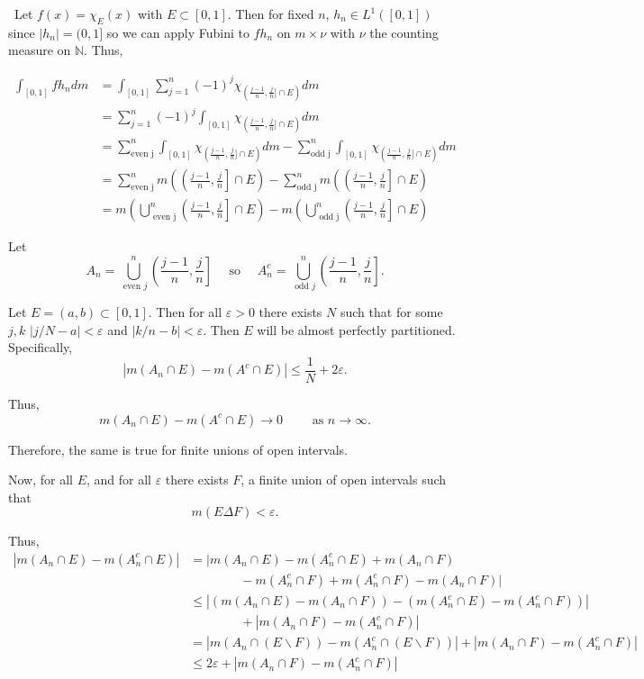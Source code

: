 \documentclass[12pt]{Qual}
\begin{document}
\begin{solution}$\,$
Let $f(x)=\chi_E(x)$ with $E\subset[0,1]$. Then for fixed $n$, $h_n\in L^1([0,1])$ since $|h_n|=(0,1]$ so we can apply Fubini to $fh_n$ on $m\times \nu$ with $\nu$ the counting measure on $\mathbb{N}$. Thus,

\begin{align*}
    \int_{[0,1]}fh_ndm&=\int_{[0,1]}\sum_{j=1}^n(-1)^j\chi_{(\frac{j-1}{n},\frac{j}{n}]\cap E)}dm\\
    &=\sum_{j=1}^n(-1)^j\int_{[0,1]}\chi_{(\frac{j-1}{n},\frac{j}{n}]\cap E)}dm\\
    &=\sum_{\text{even j}}^n\int_{[0,1]}\chi_{(\frac{j-1}{n},\frac{j}{n}]\cap E)}dm-\sum_{\text{odd j}}^n\int_{[0,1]}\chi_{(\frac{j-1}{n},\frac{j}{n}]\cap E)}dm\\
    &=\sum_{\text{even j}}^nm\left(\left(\frac{j-1}{n},\frac{j}{n}\right]\cap E\right)-\sum_{\text{odd j}}^nm\left(\left(\frac{j-1}{n},\frac{j}{n}\right]\cap E\right)\\
    &=m\left(\bigcup_{\text{ even j}}^n\left(\frac{j-1}{n},\frac{j}{n}\right]\cap E\right)-m\left(\bigcup_{\text{ odd j}}^n\left(\frac{j-1}{n},\frac{j}{n}\right]\cap E\right)
\end{align*}

Let $$A_n=\bigcup_{\text{ even }j}^n\left(\frac{j-1}{n},\frac{j}{n}\right]\quad\text{ so }\quad A_n^c=\bigcup_{\text{ odd }j}^n\left(\frac{j-1}{n},\frac{j}{n}\right].$$

Let $E=(a,b)\subset[0,1]$. Then for all $\varepsilon>0$ there exists $N$ such that for some $j,k$ $|j/N-a|<\varepsilon$ and $|k/n-b|<\varepsilon$. Then $E$ will be almost perfectly partitioned. Specifically, $$|m(A_n\cap E)-m(A^c\cap E)|\le\frac{1}{N}+2\varepsilon.$$

Thus, $$m(A_n\cap E)-m(A^c\cap E)\to0\qquad\text{ as }n\to\infty.$$

Therefore, the same is true for finite unions of open intervals.

Now, for all $E$, and for all $\varepsilon$ there exists $F$, a finite union of open intervals such that $$m(E\Delta F)<\varepsilon.$$

Thus, \begin{align*}
    |m(A_n\cap E)-m(A_n^c\cap E)|&=|m(A_n\cap E)-m(A_n^c\cap E)+m(A_n\cap F)\\
    &\qquad\qquad-m(A_n^c\cap F)+m(A_n^c\cap F)-m(A_n\cap F)|\\
    &\le|(m(A_n\cap E)-m(A_n\cap F))-(m(A_n^c\cap E)-m(A_n^c\cap F))|\\
    &\qquad\qquad+|m(A_n\cap F)-m(A_n^c\cap F)|\\
    &=|m(A_n\cap (E\backslash F))-m(A_n^c\cap (E\backslash F))|+|m(A_n\cap F)-m(A_n^c\cap F)|\\
    &\le2\varepsilon+|m(A_n\cap F)-m(A_n^c\cap F)|
\end{align*}


\end{solution}
\end{document}
